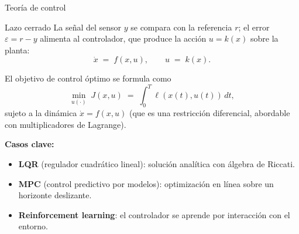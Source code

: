 \documentclass[10pt,aspectratio=169]{beamer}
\theoremstyle{definition}
\theoremstyle{plain}
\begin{document}
\begin{frame}[t]{Teoría de control}
  \begin{block}{Lazo cerrado}
    La señal del sensor $y$ se compara con la referencia $r$; el error
    $\varepsilon=r-y$ alimenta al controlador, que produce la acción
    $u=k(x)$ sobre la planta:
    \begin{equation*}
      \dot{x} \;=\; f(x,u), \qquad u \;=\; k(x).
    \end{equation*}
  \end{block}

  \vspace{0.2em}
  El objetivo de control óptimo se formula como
  \[
    \min_{u(\cdot)}\; J(x,u) \;=\; \int_{0}^{T}\!\ell(x(t),u(t))\,dt,
  \]
  sujeto a la dinámica $\dot{x}=f(x,u)$ (que es una restricción diferencial,
  abordable con multiplicadores de Lagrange).

  \vspace{0.2em}
  \textbf{Casos clave:}
  \begin{itemize}\setlength\itemsep{0pt}
    \item \textbf{LQR} (regulador cuadrático lineal): solución analítica con
          álgebra de Riccati.
    \item \textbf{MPC} (control predictivo por modelos): optimización en
          línea sobre un horizonte deslizante.
    \item \textbf{Reinforcement learning}: el controlador se aprende por
          interacción con el entorno.
  \end{itemize}

\end{frame}
\end{document}
